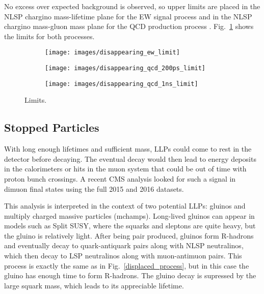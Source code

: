 \documentclass[12pt]{article}
\begin{document}
        No excess over expected background is observed, so upper limits are placed in the NLSP chargino mass-lifetime plane for the EW signal process and in the NLSP chargino mass-gluon mass plane for the QCD production process . Fig.~\ref{disappearing_limits} shows the limits for both processes.

        \noindent \begin{figure}[htbp] \begin{center}
        \begin{subfigure}[htbp]{0.3\textwidth} \begin{center}
        \texttt{[image: images/disappearing\_ew\_limit]}
        \end{center} \end{subfigure}
        \begin{subfigure}[htbp]{0.3\textwidth} \begin{center}
        \texttt{[image: images/disappearing\_qcd\_200ps\_limit]}
        \end{center} \end{subfigure}
        \begin{subfigure}[htbp]{0.3\textwidth} \begin{center}
        \texttt{[image: images/disappearing\_qcd\_1ns\_limit]}
        \end{center} \end{subfigure}
        \caption{Limits.}
        \label{disappearing_limits}
        \end{center} \end{figure}

    \subsection{Stopped Particles}
        With long enough lifetimes and sufficient mass, LLPs could come to rest in the detector before decaying. The eventual decay would then lead to energy deposits in the calorimeters or hits in the muon system that could be out of time with proton bunch crossings. A recent CMS analysis looked for such a signal in dimuon final states using the full 2015 and 2016 datasets. 

        This analysis is interpreted in the context of two potential LLPs: gluinos and multiply charged massive particles (mchamps). Long-lived gluinos can appear in models such as Split SUSY, where the squarks and sleptons are quite heavy, but the gluino is relatively light. After being pair produced, gluinos form R-hadrons and eventually decay to quark-antiquark pairs along with NLSP neutralinos, which then decay to LSP neutralinos along with muon-antimuon pairs. This process is exactly the same as in Fig.~\ref{displaced_process}, but in this case the gluino has enough time to form R-hadrons. The gluino decay is supressed by the large squark mass, which leads to its appreciable lifetime.
\end{document}
